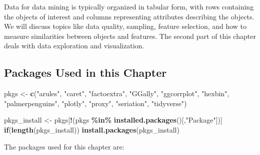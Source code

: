 \documentclass[
  notitlepage]{book}
\newenvironment{Shaded}{\begin{snugshade}}{\end{snugshade}}
\newcommand{\ControlFlowTok}[1]{\textcolor[rgb]{0.13,0.29,0.53}{\textbf{#1}}}
\newcommand{\KeywordTok}[1]{\textcolor[rgb]{0.13,0.29,0.53}{\textbf{#1}}}
\newcommand{\NormalTok}[1]{#1}
\newcommand{\OperatorTok}[1]{\textcolor[rgb]{0.81,0.36,0.00}{\textbf{#1}}}
\newcommand{\StringTok}[1]{\textcolor[rgb]{0.31,0.60,0.02}{#1}}
\begin{document}
Data for data mining is typically organized in tabular form, with rows containing
the objects of interest and columns representing attributes describing the objects.
We will discuss topics like data quality, sampling, feature selection,
and how to measure similarities between objects and features.
The second part of this chapter deals with data exploration and visualization.

\hypertarget{packages-used-in-this-chapter}{%
\subsection*{Packages Used in this Chapter}\label{packages-used-in-this-chapter}}

\begin{Shaded}
\begin{Highlighting}[]
\NormalTok{pkgs \textless{}{-}}\StringTok{ }\KeywordTok{c}\NormalTok{(}\StringTok{"arules"}\NormalTok{, }\StringTok{"caret"}\NormalTok{, }\StringTok{"factoextra"}\NormalTok{, }\StringTok{"GGally"}\NormalTok{, }
          \StringTok{"ggcorrplot"}\NormalTok{, }\StringTok{"hexbin"}\NormalTok{, }\StringTok{"palmerpenguins"}\NormalTok{, }\StringTok{"plotly"}\NormalTok{, }
          \StringTok{"proxy"}\NormalTok{, }\StringTok{"seriation"}\NormalTok{, }\StringTok{"tidyverse"}\NormalTok{)}

\NormalTok{pkgs\_install \textless{}{-}}\StringTok{ }\NormalTok{pkgs[}\OperatorTok{!}\NormalTok{(pkgs }\OperatorTok{\%in\%}\StringTok{ }\KeywordTok{installed.packages}\NormalTok{()[,}\StringTok{"Package"}\NormalTok{])]}
\ControlFlowTok{if}\NormalTok{(}\KeywordTok{length}\NormalTok{(pkgs\_install)) }\KeywordTok{install.packages}\NormalTok{(pkgs\_install)}
\end{Highlighting}
\end{Shaded}

The packages used for this chapter are:
\end{document}
